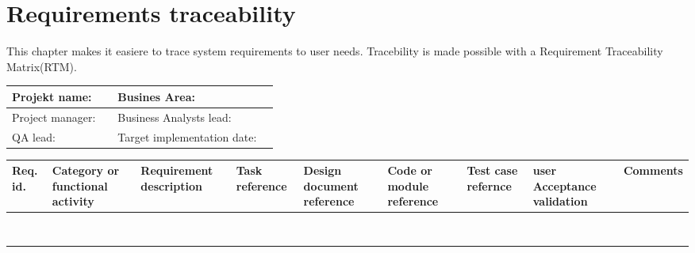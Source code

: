 \label{chp_requirementsTraceability}
\chapter{Requirements traceability}
This chapter makes it easiere to trace system requirements to user needs. Tracebility is made possible with a Requirement Traceability Matrix(RTM).

\begin{sidewaystable}
	\begin{longtable}{| p{3.4cm}  | p{5cm} |  p{3.5cm}  | p{7.8cm} |  }
		\hline
		Projekt name: 	& & Busines Area:				& \\ \hline
		Project manager:& & Business Analysts lead: 	& \\ \hline
		QA lead: 		& & Target implementation date:	& \\ \hline
	\end{longtable}
	\begin{longtable}{| p{1cm}  | p{2cm}  | p{5cm} |  p{1.5cm}  | p{1.5cm}  |  p{1.5cm}  | p{1.5cm}  |  p{1.5cm}  | p{2cm}  |  } \hline
		Req. id. 	& Category or functional activity & Requirement description & Task reference & Design document reference & Code or module reference & Test case refernce & user Acceptance validation & Comments \\ \hline
		&&&&&&&& \\ \hline
		&&&&&&&& \\ \hline
		&&&&&&&& \\ \hline
		&&&&&&&& \\ \hline
		&&&&&&&& \\ \hline
		&&&&&&&& \\ \hline
		&&&&&&&& \\ \hline
		&&&&&&&& \\ \hline
	\end{longtable}
\end{sidewaystable}